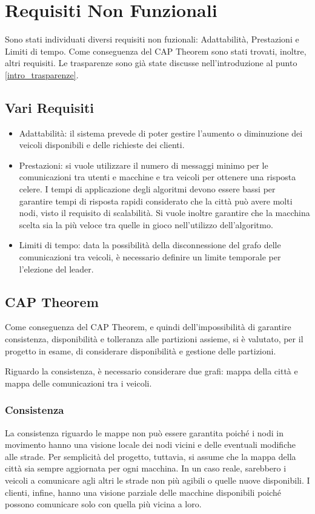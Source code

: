 \section{Requisiti Non Funzionali}
Sono stati individuati diversi requisiti non fuzionali: Adattabilità, Prestazioni e Limiti di tempo. Come conseguenza del CAP Theorem sono stati trovati, inoltre, altri requisiti.
Le trasparenze sono già state discusse nell'introduzione al punto \ref{intro_trasparenze}.

\subsection{Vari Requisiti}
\begin{itemize}
	\item Adattabilità: il sistema prevede di poter gestire l'aumento o diminuzione dei veicoli disponibili e delle richieste dei clienti.
	\item Prestazioni: si vuole utilizzare il numero di messaggi minimo per le comunicazioni tra utenti e macchine e tra veicoli per ottenere una risposta celere. I tempi di applicazione degli algoritmi devono essere bassi per garantire tempi di risposta rapidi considerato che la città può avere molti nodi, visto il requisito di scalabilità. Si vuole inoltre garantire che la macchina scelta sia la più veloce tra quelle in gioco nell'utilizzo dell'algoritmo.
	\item Limiti di tempo: data la possibilità della disconnessione del grafo delle comunicazioni tra veicoli, è necessario definire un limite temporale per l'elezione del leader.
\end{itemize}

\subsection{CAP Theorem}
Come conseguenza del CAP Theorem, e quindi dell'impossibilità di garantire consistenza, disponibilità e tolleranza alle partizioni assieme, si è valutato, per il progetto in esame, di considerare disponibilità e gestione delle partizioni.

Riguardo la consistenza, è necessario considerare due grafi: mappa della città e mappa delle comunicazioni tra i veicoli. 

\subsubsection{Consistenza}
La consistenza riguardo le mappe non può essere garantita poiché i nodi in movimento hanno una visione locale dei nodi vicini e delle eventuali modifiche alle strade. Per semplicità del progetto, tuttavia, si assume che la mappa della città sia sempre aggiornata per ogni macchina. In un caso reale, sarebbero i veicoli a comunicare agli altri le strade non più agibili o quelle nuove disponibili. I clienti, infine, hanno una visione parziale delle macchine disponibili poiché possono comunicare solo con quella più vicina a loro.

